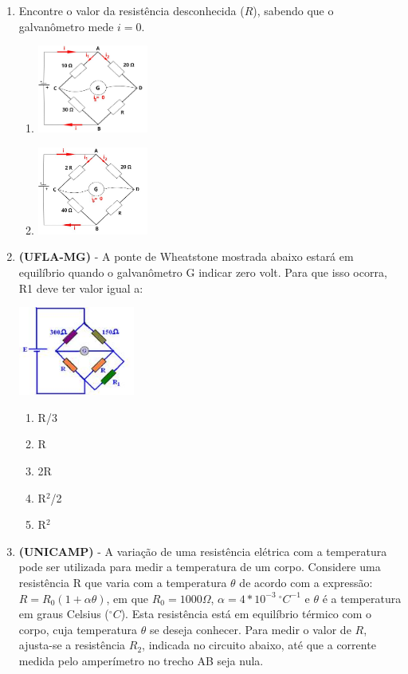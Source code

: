 \documentclass[12pt,letterpaper,fleqn]{article}
\begin{document}
\begin{itemize}
        \begin{enumerate}
            \item Encontre o valor da resistência desconhecida ($R$), sabendo que o galvanômetro mede $i=0$.
            \begin{enumerate}
                \item \includegraphics[width=0.3\textwidth]{ponte-de-wheatstone-exercicio-1.jpg}
                \item 
                \includegraphics[width=0.3\textwidth]{ponte-de-wheatstone-exercicio-2.jpg}
            \end{enumerate}
            \item \textbf{(UFLA-MG)} - A ponte de Wheatstone mostrada abaixo estará em equilíbrio quando o galvanômetro G indicar zero volt. Para que isso ocorra, R1 deve ter valor igual a:
            
            \includegraphics[width=0.3\textwidth]{ponte-de-wheatstone-ufla-11.jpg}
            \begin{enumerate}
                \item R/3
                \item R
                \item 2R
                \item R$^2$/2
                \item R$^2$
            \end{enumerate}
            \pagebreak
            \item \textbf{(UNICAMP)} - A variação de uma resistência elétrica com a temperatura pode ser utilizada para medir a temperatura de um corpo. Considere uma resistência R que varia com a temperatura $\theta$  de acordo com a expressão:
            $R=R_0(1+\alpha\theta)$, em que $R_0 = 1000 \Omega$, $\alpha = 4*10^{-3} \: ^{\circ}C^{-1}$ e $\theta$ é a temperatura em graus Celsius ($^{\circ}C$).
            Esta resistência está em equilíbrio térmico com o corpo, cuja temperatura $\theta$ se deseja conhecer. Para medir o valor de $R$, ajusta-se a resistência $R_2$, indicada no circuito abaixo, até que a corrente medida pelo amperímetro no trecho AB seja nula.
            

\end{enumerate}
\end{itemize}
\end{document}
